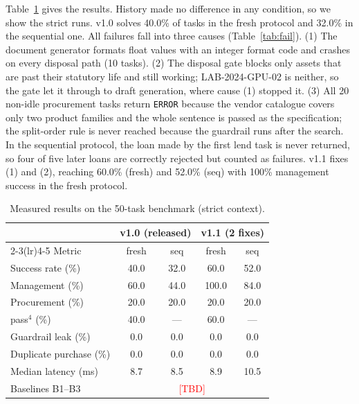 \documentclass[conference]{IEEEtran}
\newcommand{\TBD}{\textcolor{red}{[TBD]}}
\begin{document}
Table~\ref{tab:results} gives the results. History made no difference in
any condition, so we show the strict runs. v1.0 solves 40.0\% of tasks in
the fresh protocol and 32.0\% in the sequential one. All failures fall
into three causes (Table~\ref{tab:fail}). (1) The document generator
formats float values with an integer format code and crashes on every
disposal path (10 tasks). (2) The disposal gate blocks only assets that
are past their statutory life and still working; LAB-2024-GPU-02 is
neither, so the gate let it through to draft generation, where cause (1)
stopped it. (3) All 20 non-idle procurement tasks return \texttt{ERROR}
because the vendor catalogue covers only two product families and the
whole sentence is passed as the specification; the split-order rule is
never reached because the guardrail runs after the search. In the
sequential protocol, the loan made by the first lend task is never
returned, so four of five later loans are correctly rejected but counted
as failures. v1.1 fixes (1) and (2), reaching 60.0\% (fresh) and 52.0\%
(seq) with 100\% management success in the fresh protocol.

\begin{table}[t]
\centering
\caption{Measured results on the 50-task benchmark (strict context).}
\label{tab:results}
\footnotesize
\begin{tabular}{lcccc}
\toprule
 & \multicolumn{2}{c}{v1.0 (released)} & \multicolumn{2}{c}{v1.1 (2 fixes)} \\
\cmidrule(lr){2-3}\cmidrule(lr){4-5}
Metric & fresh & seq & fresh & seq \\
\midrule
Success rate (\%)        & 40.0 & 32.0 & 60.0 & 52.0 \\
\quad Management (\%)    & 60.0 & 44.0 & 100.0 & 84.0 \\
\quad Procurement (\%)   & 20.0 & 20.0 & 20.0 & 20.0 \\
pass$^4$ (\%)            & 40.0 & ---  & 60.0 & --- \\
Guardrail leak (\%)      & 0.0  & 0.0  & 0.0  & 0.0 \\
Duplicate purchase (\%)  & 0.0  & 0.0  & 0.0  & 0.0 \\
Median latency (ms)      & 8.7  & 8.5  & 8.9  & 10.5 \\
\midrule
Baselines B1--B3         & \multicolumn{4}{c}{\TBD} \\
\bottomrule
\end{tabular}
\end{table}
\end{document}

